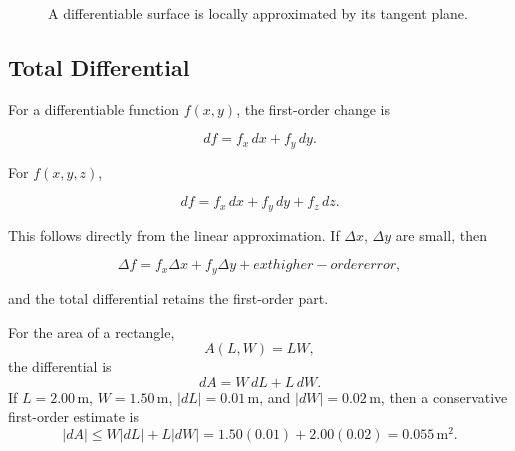 \begin{figure}[htbp]
\centering
{}
\caption{A differentiable surface is locally approximated by its tangent plane.}
\label{fig:tangent-plane-surface}
\end{figure}

\subsection{Total Differential}

For a differentiable function $f(x,y)$, the first-order change is

\begin{equation}
\boxed{
df
=
f_x\,dx+f_y\,dy.
}
\label{eq:total-differential-2d}
\end{equation}

For $f(x,y,z)$,

\begin{equation}
\boxed{
df
=
f_x\,dx+f_y\,dy+f_z\,dz.
}
\label{eq:total-differential-3d}
\end{equation}

This follows directly from the linear approximation. If $\Delta x$, $\Delta y$ are small, then

\[
\Delta f
=
f_x\Delta x+f_y\Delta y+	ext{higher-order error},
\]

and the total differential retains the first-order part.

\begin{bookexample}
For the area of a rectangle,
\[
A(L,W)=LW,
\]
the differential is
\[
dA=W\,dL+L\,dW.
\]
If $L=2.00\,\mathrm{m}$, $W=1.50\,\mathrm{m}$, $|dL|=0.01\,\mathrm{m}$, and $|dW|=0.02\,\mathrm{m}$, then a conservative first-order estimate is
\[
|dA|
\leq
W|dL|+L|dW|
=1.50(0.01)+2.00(0.02)
=0.055\,\mathrm{m}^2.
\]
\end{bookexample}

